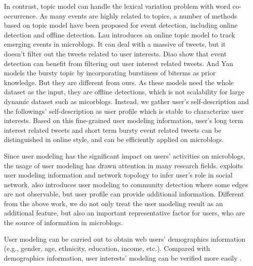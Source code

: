 \documentclass{llncs}
\begin{document}
In contrast, topic model can handle the lexical variation problem with word co-occurrence\cite{blei2003latent}.
As many events are highly related to topics, a number of methods based on topic model have been proposed for event detection, including online detection and offline detection.
Lau\cite{lau2012line} introduces an online topic model to track emerging events in microblogs.
It can deal with a massive of tweets, but it doesn't filter out the tweets related to user interests.
Diao\cite{timeUserLDA2012finding}\cite{diao2013unified} show that event detection can benefit from filtering out user interest related tweets. 
And Yan\cite{Yan:2015wm} models the bursty topic by incorporating burstiness of biterms as prior knowledge.
But they are different from ours.
As these models need the whole dataset as the input, they are offline detections, which is not scalability for large dynamic dataset such as micorblogs.
Instead, we gather user's self-description and the followings' self-description as user profile which is stable to characterize user interests. 
Based on this fine-grained user modeling information, user's long term interest related tweets and short term bursty event related tweets can be distinguished in online style, and can be efficiently applied on microblogs.

Since user modeling has the significant impact on users' activities on microblogs, the usage of user modeling has drawn attention in many research fields. 
\cite{zhao2013inferring} exploits user modeling information and network topology to infer user's role in social network.
\cite{yoshida2013toward} also introduces user modeling to community detection where some edges are not observable, but user profile can provide additional information.
Different from the above work, we do not only treat the user modeling result as an additional feature, but also an important representative factor for users, who are the source of information in microblogs.

User modeling can be carried out to obtain web users' demographics information \cite{culotta2015predicting} (e.g., gender, age, ethnicity, education, income, etc.).
Compared with demographics information, user interests' modeling can be verified more easily \cite{faralli2015large}. 


\end{document}
